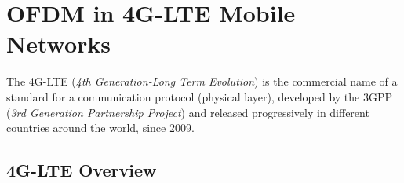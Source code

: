 \chapter{OFDM in 4G-LTE Mobile Networks}

\indent The 4G-LTE (\textit{4th Generation-Long Term Evolution}) is the commercial name of a standard for a communication protocol (physical layer), developed by the 3GPP (\textit{3rd Generation Partnership Project}) and released progressively in different countries around the world, since 2009.

\section{4G-LTE Overview}